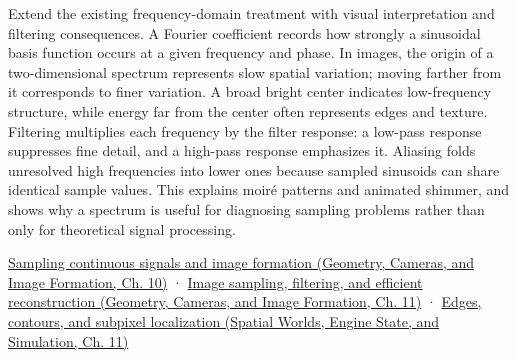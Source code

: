 Extend the existing frequency-domain treatment with visual interpretation and filtering consequences. A Fourier coefficient records how strongly a sinusoidal basis function occurs at a given frequency and phase. In images, the origin of a two-dimensional spectrum represents slow spatial variation; moving farther from it corresponds to finer variation. A broad bright center indicates low-frequency structure, while energy far from the center often represents edges and texture. Filtering multiplies each frequency by the filter response: a low-pass response suppresses fine detail, and a high-pass response emphasizes it. Aliasing folds unresolved high frequencies into lower ones because sampled sinusoids can share identical sample values. This explains moiré patterns and animated shimmer, and shows why a spectrum is useful for diagnosing sampling problems rather than only for theoretical signal processing.

\href{../03-Geometry-Cameras-and-Image-Formation/main.pdf\#nameddest=03-visual-computing-i-ch003-sampling-continuous-signals-and-image-formation}{Sampling continuous signals and image formation (Geometry, Cameras, and Image Formation, Ch. 10)} · \href{../03-Geometry-Cameras-and-Image-Formation/main.pdf\#nameddest=03-visual-computing-i-ch004-image-sampling-filtering-and-efficient-reconstruction}{Image sampling, filtering, and efficient reconstruction (Geometry, Cameras, and Image Formation, Ch. 11)} · \href{../05-Spatial-Worlds-Engine-State-and-Simulation/main.pdf\#nameddest=04-visual-computing-ii-ch030-edges-contours-and-subpixel-localization}{Edges, contours, and subpixel localization (Spatial Worlds, Engine State, and Simulation, Ch. 11)}
